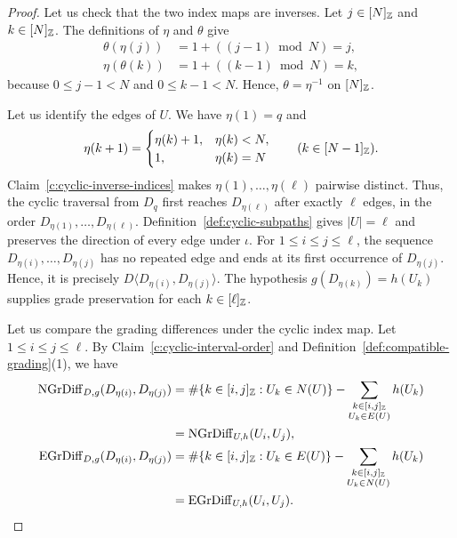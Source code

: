 \begin{proof}
 Let us check that the two index maps are inverses.
Let $j\in[N]_{\mathbb Z}$ and $k\in[N]_{\mathbb Z}$.
The definitions of $\eta$ and $\theta$ give
\[
 \begin{aligned}
 \theta(\eta(j))&=1+((j-1)\bmod N)=j,\\
 \eta(\theta(k))&=1+((k-1)\bmod N)=k,
 \end{aligned}
\]
because $0\le j-1<N$ and $0\le k-1<N$.
Hence, $\theta=\eta^{-1}$ on $[N]_{\mathbb Z}$.

 Let us identify the edges of $U$.
We have $\eta(1)=q$ and
\[
 \eta(k+1)=\begin{cases}\eta(k)+1,&\eta(k)<N,\\1,&\eta(k)=N\end{cases}
 \qquad(k\in[N-1]_{\mathbb Z}).
\]
Claim~\ref{c:cyclic-inverse-indices} makes $\eta(1),\ldots,\eta(\ell)$ pairwise distinct.
Thus, the cyclic traversal from $D_q$ first reaches $D_{\eta(\ell)}$ after exactly $\ell$ edges, in the order $D_{\eta(1)},\ldots,D_{\eta(\ell)}$.
Definition~\ref{def:cyclic-subpaths} gives $|U|=\ell$ and preserves the direction of every edge under $\iota$.
For $1\le i\le j\le\ell$, the sequence $D_{\eta(i)},\ldots,D_{\eta(j)}$ has no repeated edge and ends at its first occurrence of $D_{\eta(j)}$.
Hence, it is precisely $D\langle D_{\eta(i)},D_{\eta(j)}\rangle$.
The hypothesis $g(D_{\eta(k)})=h(U_k)$ supplies grade preservation for each $k\in[\ell]_{\mathbb Z}$.

 Let us compare the grading differences under the cyclic index map.
Let $1\le i\le j\le\ell$.
By Claim~\ref{c:cyclic-interval-order} and Definition~\ref{def:compatible-grading}(1), we have
\[
 \begin{aligned}
 \operatorname{NGrDiff}_{D,g}(D_{\eta(i)},D_{\eta(j)})
 &=\#\{k\in[i,j]_{\mathbb Z}:U_k\in N(U)\}
   -\sum_{\substack{k\in[i,j]_{\mathbb Z}\\U_k\in E(U)}}h(U_k)\\
 &=\operatorname{NGrDiff}_{U,h}(U_i,U_j),\\
 \operatorname{EGrDiff}_{D,g}(D_{\eta(i)},D_{\eta(j)})
 &=\#\{k\in[i,j]_{\mathbb Z}:U_k\in E(U)\}
   -\sum_{\substack{k\in[i,j]_{\mathbb Z}\\U_k\in N(U)}}h(U_k)\\
 &=\operatorname{EGrDiff}_{U,h}(U_i,U_j).
 \end{aligned}
\]


\end{proof}
